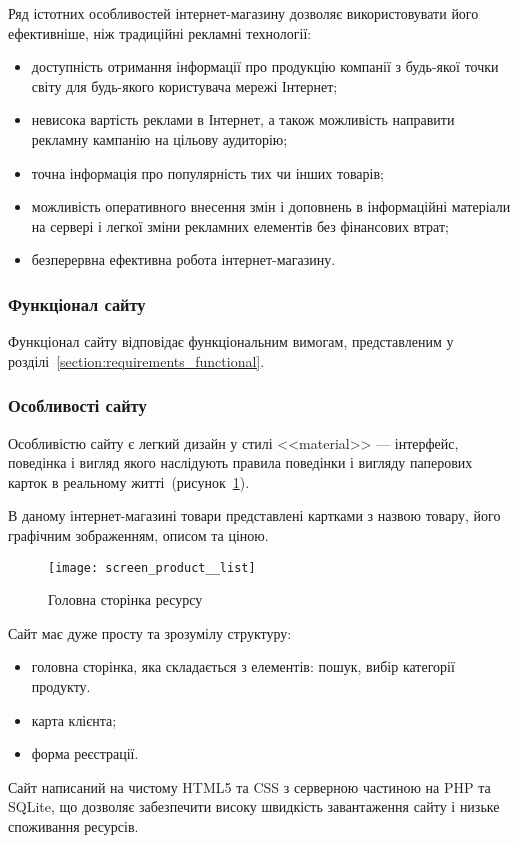 Ряд істотних особливостей інтернет-магазину дозволяє використовувати його ефективніше, ніж традиційні рекламні технології:
\begin{itemize}
    \item доступність отримання інформації про продукцію компанії з будь-якої точки світу для будь-якого користувача мережі Інтернет;
    \item невисока вартість реклами в Інтернет, а також можливість направити рекламну кампанію на цільову аудиторію;
    \item точна інформація про популярність тих чи інших товарів;
    \item можливість оперативного внесення змін і доповнень в інформаційні матеріали на сервері і легкої зміни рекламних елементів без фінансових втрат;
    \item безперервна ефективна робота інтернет-магазину.
\end{itemize}

\subsubsection{Функціонал сайту}
Функціонал сайту відповідає функціональним вимогам, представленим у розділі~\ref{section:requirements_functional}.

\subsubsection{Особливості сайту}
Особливістю сайту є легкий дизайн у стилі <<material>> --- інтерфейс, поведінка і вигляд якого наслідують правила поведінки і вигляду паперових карток в реальному житті~(рисунок~\ref{fig:site_main}). 

В даному інтернет-магазині товари представлені картками з назвою товару, його графічним зображенням, описом та ціною.

\begin{figure}[H]
    \centering
    \texttt{[image: screen\_product\_\_list]}
    \caption{Головна сторінка ресурсу}
    \label{fig:site_main}
\end{figure}

Сайт має дуже просту та зрозумілу структуру:
\begin{itemize}
    \item головна сторінка, яка складається з елементів: пошук, вибір категорії продукту.
    \item карта клієнта;
    \item форма реєстрації.
\end{itemize}

Сайт написаний на чистому HTML5 та CSS з серверною частиною на PHP та SQLite, що дозволяє забезпечити високу швидкість завантаження сайту і низьке споживання ресурсів. 
